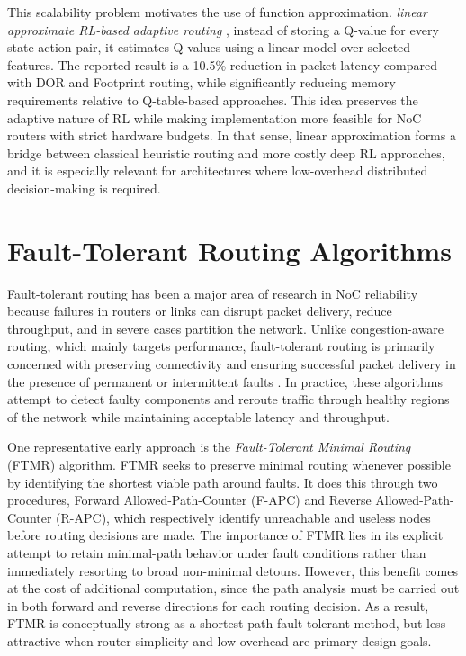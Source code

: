 This scalability problem motivates the use of function approximation. \textit{linear approximate RL-based adaptive routing} \cite{LARE2023}, instead of storing a Q-value for every state-action pair, it estimates Q-values using a linear model over selected features. The reported result is a 10.5\% reduction in packet latency compared with DOR and Footprint routing, while significantly reducing memory requirements relative to Q-table-based approaches. This idea preserves the adaptive nature of RL while making implementation more feasible for NoC routers with strict hardware budgets. In that sense, linear approximation forms a bridge between classical heuristic routing and more costly deep RL approaches, and it is especially relevant for architectures where low-overhead distributed decision-making is required.

\section{Fault-Tolerant Routing Algorithms}

Fault-tolerant routing has been a major area of research in NoC reliability because failures in routers or links can disrupt packet delivery, reduce throughput, and in severe cases partition the network. Unlike congestion-aware routing, which mainly targets performance, fault-tolerant routing is primarily concerned with preserving connectivity and ensuring successful packet delivery in the presence of permanent or intermittent faults \cite{Kondoth2026}. In practice, these algorithms attempt to detect faulty components and reroute traffic through healthy regions of the network while maintaining acceptable latency and throughput.

One representative early approach is the \textit{Fault-Tolerant Minimal Routing} (FTMR) \cite{Zhao2017} algorithm. FTMR seeks to preserve minimal routing whenever possible by identifying the shortest viable path around faults. It does this through two procedures, Forward Allowed-Path-Counter (F-APC) and Reverse Allowed-Path-Counter (R-APC), which respectively identify unreachable and useless nodes before routing decisions are made. The importance of FTMR lies in its explicit attempt to retain minimal-path behavior under fault conditions rather than immediately resorting to broad non-minimal detours. However, this benefit comes at the cost of additional computation, since the path analysis must be carried out in both forward and reverse directions for each routing decision. As a result, FTMR is conceptually strong as a shortest-path fault-tolerant method, but less attractive when router simplicity and low overhead are primary design goals.

